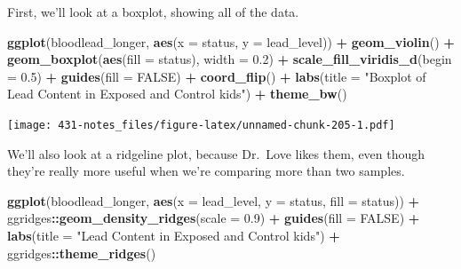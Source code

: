 \documentclass[
]{book}
\newenvironment{Shaded}{\begin{snugshade}}{\end{snugshade}}
\newcommand{\DataTypeTok}[1]{\textcolor[rgb]{0.13,0.29,0.53}{#1}}
\newcommand{\FloatTok}[1]{\textcolor[rgb]{0.00,0.00,0.81}{#1}}
\newcommand{\KeywordTok}[1]{\textcolor[rgb]{0.13,0.29,0.53}{\textbf{#1}}}
\newcommand{\NormalTok}[1]{#1}
\newcommand{\OperatorTok}[1]{\textcolor[rgb]{0.81,0.36,0.00}{\textbf{#1}}}
\newcommand{\OtherTok}[1]{\textcolor[rgb]{0.56,0.35,0.01}{#1}}
\newcommand{\StringTok}[1]{\textcolor[rgb]{0.31,0.60,0.02}{#1}}
\begin{document}
First, we'll look at a boxplot, showing all of the data.

\begin{Shaded}
\begin{Highlighting}[]
\KeywordTok{ggplot}\NormalTok{(bloodlead_longer, }\KeywordTok{aes}\NormalTok{(}\DataTypeTok{x =}\NormalTok{ status, }\DataTypeTok{y =}\NormalTok{ lead_level)) }\OperatorTok{+}
\StringTok{    }\KeywordTok{geom_violin}\NormalTok{() }\OperatorTok{+}
\StringTok{    }\KeywordTok{geom_boxplot}\NormalTok{(}\KeywordTok{aes}\NormalTok{(}\DataTypeTok{fill =}\NormalTok{ status), }\DataTypeTok{width =} \FloatTok{0.2}\NormalTok{) }\OperatorTok{+}
\StringTok{    }\KeywordTok{scale_fill_viridis_d}\NormalTok{(}\DataTypeTok{begin =} \FloatTok{0.5}\NormalTok{) }\OperatorTok{+}
\StringTok{    }\KeywordTok{guides}\NormalTok{(}\DataTypeTok{fill =} \OtherTok{FALSE}\NormalTok{) }\OperatorTok{+}\StringTok{ }
\StringTok{    }\KeywordTok{coord_flip}\NormalTok{() }\OperatorTok{+}
\StringTok{    }\KeywordTok{labs}\NormalTok{(}\DataTypeTok{title =} \StringTok{"Boxplot of Lead Content in Exposed and Control kids"}\NormalTok{) }\OperatorTok{+}\StringTok{ }
\StringTok{    }\KeywordTok{theme_bw}\NormalTok{()}
\end{Highlighting}
\end{Shaded}

\texttt{[image: 431-notes\_files/figure-latex/unnamed-chunk-205-1.pdf]}

We'll also look at a ridgeline plot, because Dr.~Love likes them, even though they're really more useful when we're comparing more than two samples.

\begin{Shaded}
\begin{Highlighting}[]
\KeywordTok{ggplot}\NormalTok{(bloodlead_longer, }\KeywordTok{aes}\NormalTok{(}\DataTypeTok{x =}\NormalTok{ lead_level, }\DataTypeTok{y =}\NormalTok{ status, }\DataTypeTok{fill =}\NormalTok{ status)) }\OperatorTok{+}
\StringTok{    }\NormalTok{ggridges}\OperatorTok{::}\KeywordTok{geom_density_ridges}\NormalTok{(}\DataTypeTok{scale =} \FloatTok{0.9}\NormalTok{) }\OperatorTok{+}
\StringTok{    }\KeywordTok{guides}\NormalTok{(}\DataTypeTok{fill =} \OtherTok{FALSE}\NormalTok{) }\OperatorTok{+}\StringTok{ }
\StringTok{    }\KeywordTok{labs}\NormalTok{(}\DataTypeTok{title =} \StringTok{"Lead Content in Exposed and Control kids"}\NormalTok{) }\OperatorTok{+}
\StringTok{    }\NormalTok{ggridges}\OperatorTok{::}\KeywordTok{theme_ridges}\NormalTok{()}
\end{Highlighting}
\end{Shaded}
\end{document}
